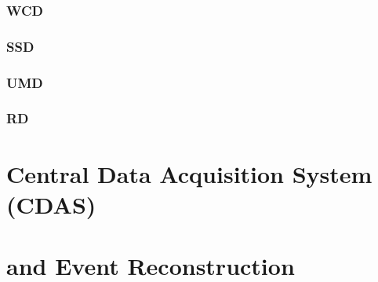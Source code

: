 \subsubsection{\acf{WCD}}
\label{sssec:wcd}

\subsubsection{\acf{SSD}}
\label{sssec:ssd}

\subsubsection{\acf{UMD}}
\label{sssec:umd}

\subsubsection{\acf{RD}}
\label{sssec:rd}

\section{Central Data Acquisition System (CDAS)}
\label{sec:cdas}



\section{\Offline and Event Reconstruction}
\label{sec:event-reconstruction}


